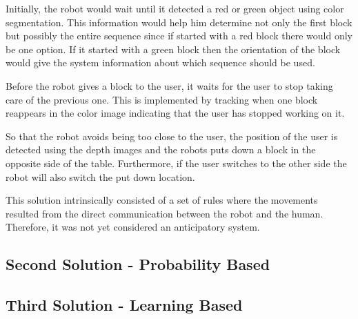 Initially, the robot would wait until it detected a red or green object using color segmentation. This information would help him determine not only the first block but possibly the entire sequence since if started with a red block there would only be one option. If it started with a green block then the orientation of the block would give the system information about which sequence should be used.

Before the robot gives a block to the user, it waits for the user to stop taking care of the previous one. This is implemented by tracking when one block reappears in the color image indicating that the user has stopped working on it.

So that the robot avoids being too close to the user, the position of the user is detected using the depth images and the robots puts down a block in the opposite side of the table. Furthermore, if the user switches to the other side the robot will also switch the put down location.
\fi

This solution intrinsically consisted of a set of rules where the movements resulted from the direct communication between the robot and the human. Therefore, it was not yet considered an anticipatory system.

\subsection{Second Solution - Probability Based}

\subsection{Third Solution - Learning Based}